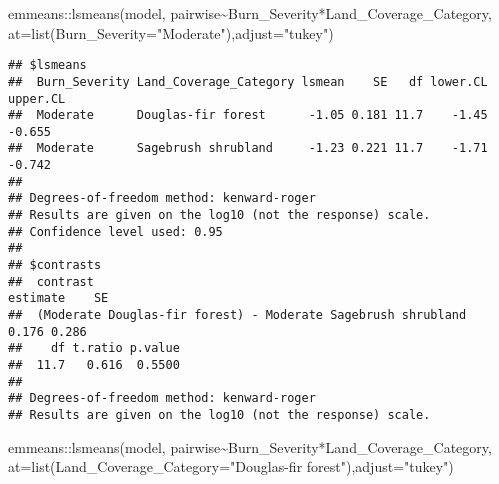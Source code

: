\documentclass[
]{article}
\newenvironment{Shaded}{\begin{snugshade}}{\end{snugshade}}
\newcommand{\AttributeTok}[1]{\textcolor[rgb]{0.77,0.63,0.00}{#1}}
\newcommand{\FunctionTok}[1]{\textcolor[rgb]{0.00,0.00,0.00}{#1}}
\newcommand{\NormalTok}[1]{#1}
\newcommand{\SpecialCharTok}[1]{\textcolor[rgb]{0.00,0.00,0.00}{#1}}
\newcommand{\StringTok}[1]{\textcolor[rgb]{0.31,0.60,0.02}{#1}}
\begin{document}
\begin{Shaded}
\begin{Highlighting}[]
\NormalTok{emmeans}\SpecialCharTok{::}\FunctionTok{lsmeans}\NormalTok{(model, pairwise}\SpecialCharTok{\textasciitilde{}}\NormalTok{Burn\_Severity}\SpecialCharTok{*}\NormalTok{Land\_Coverage\_Category, }\AttributeTok{at=}\FunctionTok{list}\NormalTok{(}\AttributeTok{Burn\_Severity=}\StringTok{"Moderate"}\NormalTok{),}\AttributeTok{adjust=}\StringTok{"tukey"}\NormalTok{)}
\end{Highlighting}
\end{Shaded}

\begin{verbatim}
## $lsmeans
##  Burn_Severity Land_Coverage_Category lsmean    SE   df lower.CL upper.CL
##  Moderate      Douglas-fir forest      -1.05 0.181 11.7    -1.45   -0.655
##  Moderate      Sagebrush shrubland     -1.23 0.221 11.7    -1.71   -0.742
## 
## Degrees-of-freedom method: kenward-roger 
## Results are given on the log10 (not the response) scale. 
## Confidence level used: 0.95 
## 
## $contrasts
##  contrast                                                     estimate    SE
##  (Moderate Douglas-fir forest) - Moderate Sagebrush shrubland    0.176 0.286
##    df t.ratio p.value
##  11.7   0.616  0.5500
## 
## Degrees-of-freedom method: kenward-roger 
## Results are given on the log10 (not the response) scale.
\end{verbatim}

\begin{Shaded}
\begin{Highlighting}[]
\NormalTok{emmeans}\SpecialCharTok{::}\FunctionTok{lsmeans}\NormalTok{(model, pairwise}\SpecialCharTok{\textasciitilde{}}\NormalTok{Burn\_Severity}\SpecialCharTok{*}\NormalTok{Land\_Coverage\_Category, }\AttributeTok{at=}\FunctionTok{list}\NormalTok{(}\AttributeTok{Land\_Coverage\_Category=}\StringTok{"Douglas{-}fir forest"}\NormalTok{),}\AttributeTok{adjust=}\StringTok{"tukey"}\NormalTok{)}
\end{Highlighting}
\end{Shaded}
\end{document}

